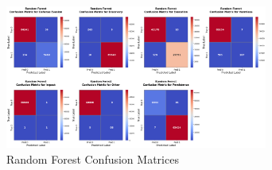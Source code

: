         \begin{figure}[H]
        
            \centering
            
            \begin{minipage}{\textwidth}
                \centering
                \begin{minipage}[c]{\textwidth}
                    \centering
                    \includegraphics[width=0.77\textwidth]{../figures/plots/section2/Random_Forest_normalized_confusion_matrix_test.png}
                    \caption{Random Forest Confusion Matrices}
                    \label{fig:rf_cm_base}
                \end{minipage}%
            \end{minipage}

            \vspace{0.5cm}  %
            

\end{figure}
